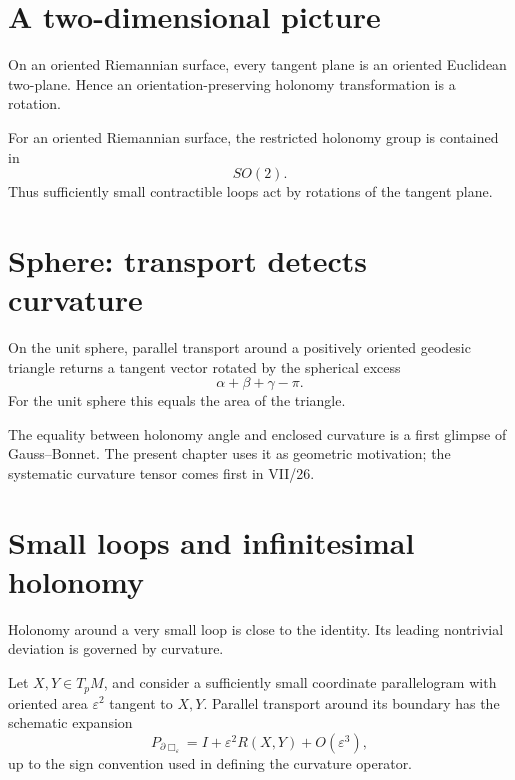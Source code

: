 \section{A two-dimensional picture}

On an oriented Riemannian surface, every tangent plane is an oriented Euclidean
two-plane.  Hence an orientation-preserving holonomy transformation is a rotation.

\begin{proposition}\label{prop:vii25-surface-angle}
For an oriented Riemannian surface, the restricted holonomy group is contained in
\[
SO(2).
\]
Thus sufficiently small contractible loops act by rotations of the tangent plane.
\end{proposition}

\section{Sphere: transport detects curvature}

\begin{example}\label{ex:vii25-sphere-triangle}
On the unit sphere, parallel transport around a positively oriented geodesic
triangle returns a tangent vector rotated by the spherical excess
\[
\alpha+\beta+\gamma-\pi.
\]
For the unit sphere this equals the area of the triangle.
\end{example}

\begin{remark}\label{rem:vii25-gauss-bonnet}
The equality between holonomy angle and enclosed curvature is a first glimpse of
Gauss--Bonnet.  The present chapter uses it as geometric motivation; the systematic
curvature tensor comes first in VII/26.
\end{remark}

\section{Small loops and infinitesimal holonomy}

Holonomy around a very small loop is close to the identity.  Its leading
nontrivial deviation is governed by curvature.

\begin{theorem}\label{thm:vii25-infinitesimal}
Let \(X,Y\in T_pM\), and consider a sufficiently small coordinate parallelogram
with oriented area \(\varepsilon^2\) tangent to \(X,Y\).  Parallel transport around
its boundary has the schematic expansion
\[
P_{\partial\Box_\varepsilon}
=
I+\varepsilon^2 R(X,Y)+O(\varepsilon^3),
\]
up to the sign convention used in defining the curvature operator.
\end{theorem}

